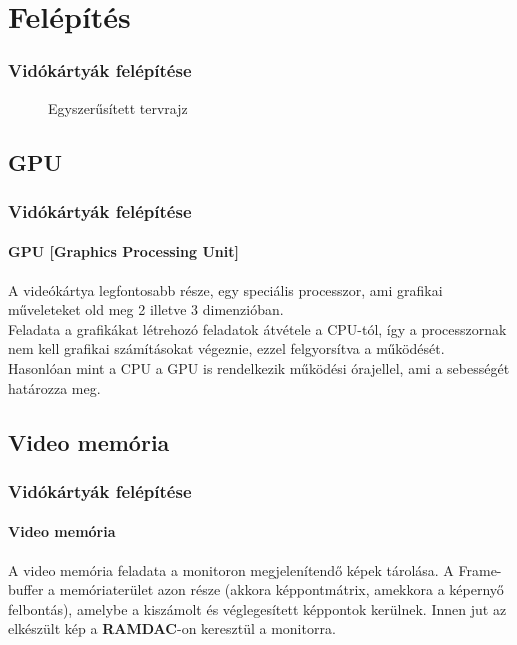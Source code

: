 \documentclass[tikz,border=10pt]{beamer}
\begin{document}
\section{Felépítés}
\begin{frame}
\frametitle{Vidókártyák felépítése}
\transwipe[direction=180]
\begin{figure}
\centering
{}
\caption{Egyszerűsített tervrajz}
\end{figure}

\end{frame}

\subsection{GPU}
\begin{frame}
\frametitle{Vidókártyák felépítése}
\framesubtitle{GPU [Graphics Processing Unit]}
\transwipe[direction=90]
A videókártya legfontosabb része, egy speciális processzor, ami grafikai műveleteket old meg 2 illetve 3 dimenzióban.\\
Feladata a grafikákat létrehozó feladatok átvétele a CPU-tól, így a processzornak nem kell grafikai számításokat végeznie, ezzel felgyorsítva a működését.\\
Hasonlóan mint a CPU a GPU is rendelkezik működési órajellel, ami a sebességét határozza meg.
\end{frame}

\subsection{Video memória}
\begin{frame}
\transwipe[direction=90]
\frametitle{Vidókártyák felépítése}
\framesubtitle{Video memória}
A video memória feladata a monitoron megjelenítendő képek tárolása. A Frame-buffer a
memóriaterület azon része (akkora képpontmátrix, amekkora a képernyő felbontás),
amelybe a kiszámolt és véglegesített képpontok kerülnek. Innen jut az elkészült kép a
\textbf{RAMDAC}-on keresztül a monitorra.
\end{frame}
\end{document}
